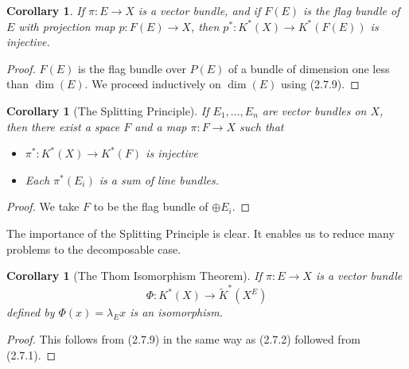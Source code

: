 \documentclass[leqno]{book}
\numberwithin{equation}{section}
\newtheorem{corollary}[theorem]{Corollary}
\theoremstyle{definition}
\begin{document}
            \begin{corollary}
              If $\pi:E\to X$ is a vector bundle, and if $F(E)$ is the flag bundle of $E$ with projection map $p:F(E)\to X$, then $p^{*}:K^{*}(X)\to K^{*}(F(E))$ is injective.
            \end{corollary}

            \begin{proof}
              $F(E)$ is the flag bundle over $P(E)$ of a bundle of dimension one less than $\operatorname{dim}(E)$. We proceed inductively on $\operatorname{dim}(E)$ using (2.7.9).
            \end{proof}

            \begin{corollary}[The Splitting Principle]
              If $E_1, \ldots ,E_{n}$ are vector bundles on $X$, then there exist a space $F$ and a map $\pi:F\to X$ such that
              \begin{itemize}
                \item [(1)] $\pi^{*}:K^{*}(X)\to K^{*}(F)$ is injective
                \item [(2)] Each $\pi^{*}(E_{i})$ is a sum of line bundles.
              \end{itemize}
            \end{corollary}
            
            \begin{proof}
              We take $F$ to be the flag bundle of $\oplus E_{i}$.
            \end{proof}

            The importance of the Splitting Principle is clear. It enables us to reduce many problems to the decomposable case.

            \begin{corollary}[The Thom Isomorphism Theorem]
              If $\pi:E\to X$ is a vector bundle
              \begin{equation*}
                \Phi: K^{*}(X)\to \tilde{K}^{*}(X^{E})
              \end{equation*}
              defined by $\Phi(x)=\lambda_{E}x$ is an isomorphism.
            \end{corollary}

            \begin{proof}
              This follows from (2.7.9) in the same way as (2.7.2) followed from (2.7.1).
            \end{proof}
\end{document}
